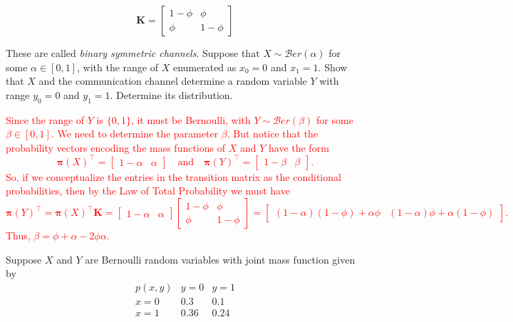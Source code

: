 \documentclass[12pt,reqno]{amsart}
\begin{document}
	\[\mathbf{K} = \begin{bmatrix}
	1 - \phi & \phi \\
	\phi & 1-\phi
	\end{bmatrix}
	\]
	
These are called \textit{binary symmetric channels}. Suppose that $X \sim \mathcal{B}er(\alpha)$ for some $\alpha \in [0,1]$, with the range of $X$ enumerated as $x_0 = 0$ and $x_1=1$. Show that $X$ and the communication channel determine a random variable $Y$ with range $y_0=0$ and $y_1=1$. Determine its distribution.

\bigskip
\textcolor{red}{Since the range of $Y$ is $\{0,1\}$, it must be Bernoulli, with $Y \sim \mathcal{B}er(\beta)$ for some $\beta \in [0,1]$. We need to determine the parameter $\beta$. But notice that the probability vectors encoding the mass functions of $X$ and $Y$ have the form
	\[\boldsymbol{\pi}(X)^\intercal = \begin{bmatrix} 1- \alpha & \alpha \end{bmatrix} \quad \text{and} \quad \boldsymbol{\pi}(Y)^\intercal = \begin{bmatrix} 1- \beta & \beta \end{bmatrix}.
	\]
So, if we conceptualize the entries in the transition matrix as the conditional probabilities, then by the Law of Total Probability we must have
	\[\boldsymbol{\pi}(Y)^\intercal = \boldsymbol{\pi}(X)^\intercal\mathbf{K} = \begin{bmatrix} 1- \alpha & \alpha \end{bmatrix} \begin{bmatrix}
	1 - \phi & \phi \\
	\phi & 1-\phi
	\end{bmatrix}
 = \begin{bmatrix} (1-\alpha)(1-\phi) + \alpha \phi & (1-\alpha)\phi + \alpha(1-\phi) \end{bmatrix}.
	\]
Thus, $\beta = \phi + \alpha - 2\phi \alpha$.}
\bigskip








\prob Suppose $X$ and $Y$ are Bernoulli random variables with joint mass function given by
	\[\begin{array}{c|cc}
	p(x,y) & y=0 & y=1 \\ \hline
	x=0 & 0.3 & 0.1 \\ 
	x=1 & 0.36 & 0.24
	\end{array}
	\]
	
\end{document}
